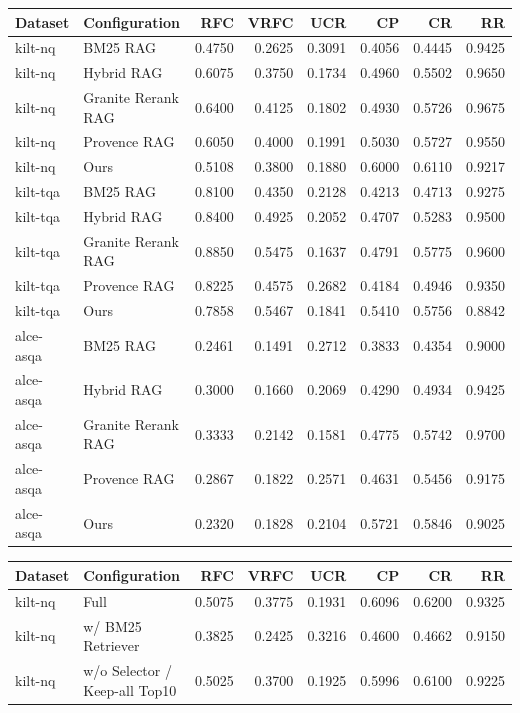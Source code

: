 \begin{table}[t]
\centering
\begin{tabular}{llrrrrrr}
Dataset & Configuration & RFC & VRFC & UCR & CP & CR & RR \\
\hline
kilt-nq & BM25 RAG & 0.4750 & 0.2625 & 0.3091 & 0.4056 & 0.4445 & 0.9425 \\
kilt-nq & Hybrid RAG & 0.6075 & 0.3750 & 0.1734 & 0.4960 & 0.5502 & 0.9650 \\
kilt-nq & Granite Rerank RAG & 0.6400 & 0.4125 & 0.1802 & 0.4930 & 0.5726 & 0.9675 \\
kilt-nq & Provence RAG & 0.6050 & 0.4000 & 0.1991 & 0.5030 & 0.5727 & 0.9550 \\
kilt-nq & Ours & 0.5108 & 0.3800 & 0.1880 & 0.6000 & 0.6110 & 0.9217 \\
kilt-tqa & BM25 RAG & 0.8100 & 0.4350 & 0.2128 & 0.4213 & 0.4713 & 0.9275 \\
kilt-tqa & Hybrid RAG & 0.8400 & 0.4925 & 0.2052 & 0.4707 & 0.5283 & 0.9500 \\
kilt-tqa & Granite Rerank RAG & 0.8850 & 0.5475 & 0.1637 & 0.4791 & 0.5775 & 0.9600 \\
kilt-tqa & Provence RAG & 0.8225 & 0.4575 & 0.2682 & 0.4184 & 0.4946 & 0.9350 \\
kilt-tqa & Ours & 0.7858 & 0.5467 & 0.1841 & 0.5410 & 0.5756 & 0.8842 \\
alce-asqa & BM25 RAG & 0.2461 & 0.1491 & 0.2712 & 0.3833 & 0.4354 & 0.9000 \\
alce-asqa & Hybrid RAG & 0.3000 & 0.1660 & 0.2069 & 0.4290 & 0.4934 & 0.9425 \\
alce-asqa & Granite Rerank RAG & 0.3333 & 0.2142 & 0.1581 & 0.4775 & 0.5742 & 0.9700 \\
alce-asqa & Provence RAG & 0.2867 & 0.1822 & 0.2571 & 0.4631 & 0.5456 & 0.9175 \\
alce-asqa & Ours & 0.2320 & 0.1828 & 0.2104 & 0.5721 & 0.5846 & 0.9025 \\
\end{tabular}
\medskip
\begin{tabular}{llrrrrrr}
Dataset & Configuration & RFC & VRFC & UCR & CP & CR & RR \\
\hline
kilt-nq & Full & 0.5075 & 0.3775 & 0.1931 & 0.6096 & 0.6200 & 0.9325 \\
kilt-nq & w/ BM25 Retriever & 0.3825 & 0.2425 & 0.3216 & 0.4600 & 0.4662 & 0.9150 \\
kilt-nq & w/o Selector / Keep-all Top10 & 0.5025 & 0.3700 & 0.1925 & 0.5996 & 0.6100 & 0.9225 \\

\end{tabular}
\end{table}
